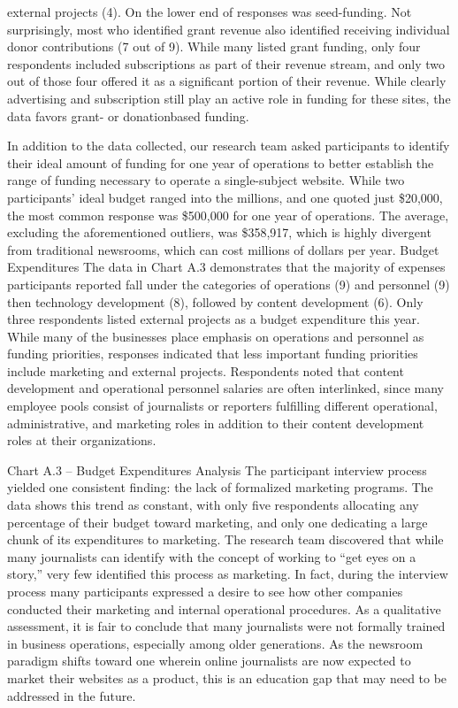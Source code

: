 external projects (4). On the lower end of responses was seed-funding. Not
surprisingly, most who identified grant revenue also identified receiving
individual donor contributions (7 out of 9). While many listed grant funding,
only four respondents included subscriptions as part of their revenue
stream, and only two out of those four offered it as a significant portion
of their revenue. While clearly advertising and subscription still play an
active role in funding for these sites, the data favors grant- or donationbased
funding.

In addition to the data collected, our research team asked participants to
identify their ideal amount of funding for one year of operations to better
establish the range of funding necessary to operate a single-subject website.
While two participants’ ideal budget ranged into the millions, and one
quoted just \$20,000, the most common response was \$500,000 for one year
of operations. The average, excluding the aforementioned outliers, was
\$358,917, which is highly divergent from traditional newsrooms, which can
cost millions of dollars per year.
Budget Expenditures
The data in Chart A.3 demonstrates that the majority of expenses participants
reported fall under the categories of operations (9) and personnel (9)
then technology development (8), followed by content development (6).
Only three respondents listed external projects as a budget expenditure this
year. While many of the businesses place emphasis on operations and personnel
as funding priorities, responses indicated that less important funding
priorities include marketing and external projects. Respondents noted
that content development and operational personnel salaries are often
interlinked, since many employee pools consist of journalists or reporters
fulfilling different operational, administrative, and marketing roles in addition
to their content development roles at their organizations.

Chart A.3 – Budget Expenditures Analysis
The participant interview process yielded one consistent finding: the lack
of formalized marketing programs. The data shows this trend as constant,
with only five respondents allocating any percentage of their budget toward
marketing, and only one dedicating a large chunk of its expenditures to
marketing. The research team discovered that while many journalists can
identify with the concept of working to ``get eyes on a story,'' very few identified
this process as marketing. In fact, during the interview process many
participants expressed a desire to see how other companies conducted their
marketing and internal operational procedures. As a qualitative assessment,
it is fair to conclude that many journalists were not formally trained in business
operations, especially among older generations. As the newsroom
paradigm shifts toward one wherein online journalists are now expected to
market their websites as a product, this is an education gap that may need
to be addressed in the future.



